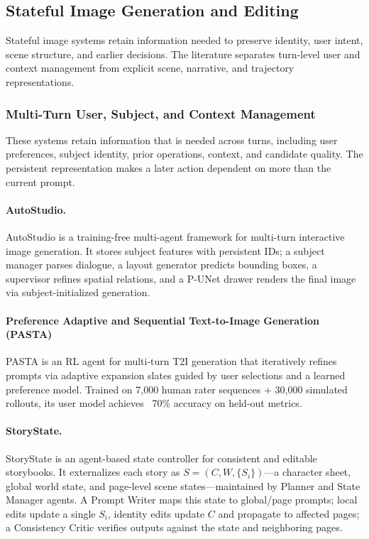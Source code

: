 \subsection{Stateful Image Generation and Editing}
Stateful image systems retain information needed to preserve identity, user intent, scene structure, and earlier decisions. The literature separates turn-level user and context management from explicit scene, narrative, and trajectory representations.

\subsubsection{Multi-Turn User, Subject, and Context Management}
These systems retain information that is needed across turns, including user preferences, subject identity, prior operations, context, and candidate quality. The persistent representation makes a later action dependent on more than the current prompt.

\paragraph{AutoStudio.}
AutoStudio is a training-free multi-agent framework for multi-turn interactive image generation. It stores subject features with persistent IDs; a subject manager parses dialogue, a layout generator predicts bounding boxes, a supervisor refines spatial relations, and a P-UNet drawer renders the final image via subject-initialized generation.~\cite{cheng2024autostudio}

\paragraph{Preference Adaptive and Sequential Text-to-Image Generation (PASTA)}
PASTA is an RL agent for multi-turn T2I generation that iteratively refines prompts via adaptive expansion slates guided by user selections and a learned preference model. Trained on 7,000 human rater sequences + 30,000 simulated rollouts, its user model achieves ~70\% accuracy on held-out metrics.  ~\cite{nabati2025pasta}

\paragraph{StoryState.}
StoryState is an agent-based state controller for consistent and editable storybooks. It externalizes each story as $S=(C,W,\{S_i\})$—a character sheet, global world state, and page-level scene states—maintained by Planner and State Manager agents. A Prompt Writer maps this state to global/page prompts; local edits update a single $S_i$, identity edits update $C$ and propagate to affected pages; a Consistency Critic verifies outputs against the state and neighboring pages. ~\cite{sarkar2026storystate}

